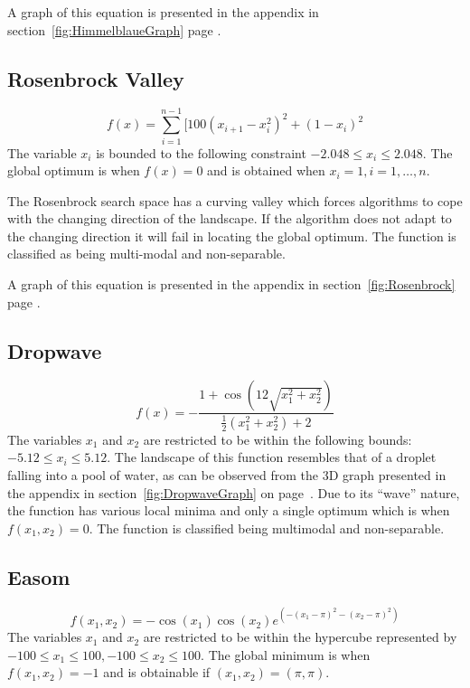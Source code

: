 A graph of this equation is presented in the appendix in section~\ref{fig:HimmelblaueGraph} page \pageref{fig:HimmelblaueGraph}.
\subsection{Rosenbrock Valley}
\begin{equation}
	f(x) = \sum_{i=1}^{n-1}[100(x_{i+1} - x_i^2)^2 + (1-x_i)^2
\end{equation}
The variable $x_i$ is bounded to the following constraint $ -2.048 \leq x_i \leq 2.048 $\cite{numericalABC,ABCCompareStudy,ARPSO,PerfABC,TSGlobalOptContinFunc,HybridIntelliGA}. The global optimum is when $f(x) = 0$ and is obtained when $x_i = 1, i = 1,\ldots,n$\cite{numericalABC,ABCCompareStudy,ARPSO,TSGlobalOptContinFunc,HybridIntelliGA}.

The Rosenbrock search space has a curving valley which forces algorithms to cope with the changing direction of the landscape\cite{numericalABC,ABCCompareStudy,ChaoticABC,PerfABC,HybridIntelliGA}. If the algorithm does not adapt to the changing direction it will fail in locating the global optimum. The function is classified as being multi-modal and non-separable\cite{numericalABC,ABCCompareStudy,ChaoticABC,PerfABC,HybridIntelliGA}.

A graph of this equation is presented in the appendix in section~\ref{fig:Rosenbrock} page \pageref{fig:Rosenbrock}.
\subsection{Dropwave}
\begin{equation}
	f(x) = -\frac{1 + \cos{(12\sqrt{x_1^2 + x_2^2})}}{\frac{1}{2}(x_1^2 + x_2^2) + 2}
\end{equation}
The variables $x_1$ and $x_2$ are restricted to be within the following bounds: $-5.12 \leq x_i \leq 5.12$\cite{TestFunctions}. The landscape of this function resembles that of a droplet falling into a pool of water, as can be observed from the 3D graph presented in the appendix in section~\ref{fig:DropwaveGraph} on page~\pageref{fig:DropwaveGraph}. Due to its ``wave'' nature, the function has various local minima and only a single optimum which is when $f(x_1,x_2) = 0$. The function is classified being multimodal and non-separable\cite{TestFunctions}.

\subsection{Easom}
\begin{equation}
	f(x_1,x_2) = -\cos(x_1)\cos(x_2)e^{(-(x_1 - \pi)^2 - (x_2 - \pi)^2)}
\end{equation}
The variables $x_1$ and $x_2$ are restricted to be within the hypercube represented by $-100 \leq x_1 \leq 100, -100 \leq x_2 \leq 100$\cite{TSGlobalOptContinFunc,ContinACSTS,TestFunctions}. The global minimum is when $f(x_1,x_2) = -1$ and is obtainable if $(x_1,x_2) = (\pi,\pi)$\cite{TSGlobalOptContinFunc,ContinACSTS,TestFunctions}. 

